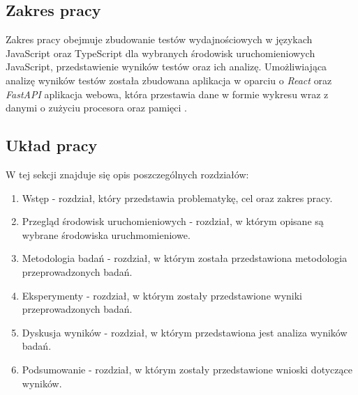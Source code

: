 \subsection{Zakres pracy}
Zakres pracy obejmuje zbudowanie testów wydajnościowych w językach JavaScript oraz TypeScript dla wybranych środowisk uruchomieniowych JavaScript, przedstawienie wyników testów oraz ich analizę. Umożliwiająca analizę wyników testów została zbudowana aplikacja w oparciu o \textit{React} \cite{React} oraz \textit{FastAPI} \cite{FastAPI} aplikacja webowa, która przestawia dane w formie wykresu wraz z danymi o zużyciu procesora oraz pamięci .

\subsection{Układ pracy}
W tej sekcji znajduje się opis poszczególnych rozdziałów:
\begin{enumerate}
  \item Wstęp - rozdział, który przedstawia problematykę, cel oraz zakres pracy.
  \item Przegląd środowisk uruchomieniowych - rozdział, w którym opisane są wybrane środowiska uruchmomieniowe.
  \item Metodologia badań - rozdział, w którym została przedstawiona metodologia przeprowadzonych badań.
  \item Eksperymenty - rozdział, w którym zostały przedstawione wyniki przeprowadzonych badań.
  \item Dyskusja wyników - rozdział, w którym przedstawiona jest analiza wyników badań.
  \item Podsumowanie - rozdział, w którym zostały przedstawione wnioski dotyczące wyników.
\end{enumerate}
